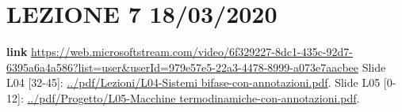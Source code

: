 \section*{LEZIONE 7 18/03/2020}
\textbf{link} \url{https://web.microsoftstream.com/video/6f329227-8dc1-435c-92d7-6395a6a4a586?list=user&userId=979e57e5-22a3-4478-8999-a073e7aacbee}\newline
\newline
Slide L04 [32-45]: \url{../pdf/Lezioni/L04-Sistemi bifase-con-annotazioni.pdf}.\newline
\newline
Slide L05 [0-12]: \url{../pdf/Progetto/L05-Macchine termodinamiche-con-annotazioni.pdf}.\newline
\newline





